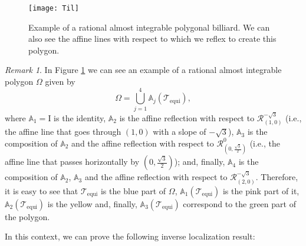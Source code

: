 \documentclass{amsart}
\theoremstyle{definition}
\theoremstyle{remark}
\newtheorem{remark}[theorem]{Remark}
\numberwithin{equation}{section}
\theoremstyle{definition}
\theoremstyle{remark}
\newcommand{\I}{{\mathrm I}}
\begin{document}
\begin{figure}\renewcommand\thefigure{6.1}
	\texttt{[image: Til]}
	\caption{Example of a rational almost integrable polygonal billiard. We can also see the affine lines with respect to which we reflex to create this polygon. }\label{til}
\end{figure} 

\begin{remark}
In Figure \ref{til} we can see an example of a rational almost integrable polygon $\Omega$ given by \begin{equation}
	\Omega=\bigcup_{j=1}^4\mathbb{A}_j\left(\mathcal{T}_\mathrm{equi}\right),
\end{equation}where $\mathbb{A}_1=\I$ is the identity, $\mathbb{A}_2$ is the affine reflection with respect to $\mathcal{R}_{(1,0)}^{-\sqrt{3}}$ (i.e., the affine line that goes through $(1,0)$ with a slope of $-\sqrt{3}$), $\mathbb{A}_3$ is the composition of $\mathbb{A}_2$ and the affine reflection with respect to $\mathcal{R}_{\left(0,\frac{\sqrt{3}}{2}\right)}^{0}$ (i.e., the affine line that passes horizontally by $\left(0,\frac{\sqrt{3}}{2}\right)$); and, finally, $\mathbb{A}_4$ is the composition of $\mathbb{A}_2$, $\mathbb{A}_3$ and the affine reflection with respect to $\mathcal{R}_{(2,0)}^{-\sqrt{3}}$. Therefore, it is easy to see that $\mathcal{T}_\mathrm{equi}$ is the blue part of $\Omega$, $\mathbb{A}_1\left(\mathcal{T}_\mathrm{equi}\right)$ is the pink part of it, $\mathbb{A}_2\left(\mathcal{T}_\mathrm{equi}\right)$ is the yellow and, finally, $\mathbb{A}_3\left(\mathcal{T}_\mathrm{equi}\right)$ correspond to the green part of the polygon.

 \end{remark}
 
In this context, we can prove the following inverse localization result: 
\end{document}
